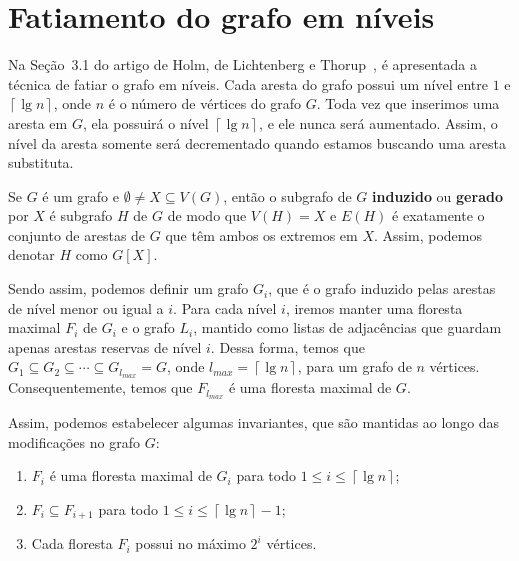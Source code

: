 \newpage

\section{Fatiamento do grafo em níveis}
\label{sec:level-slicing}

Na Seção~3.1 do artigo de Holm, de Lichtenberg e Thorup~\cite{jacob_holm}, é apresentada a técnica de fatiar o grafo em níveis. Cada aresta do grafo possui um nível entre $1$ e $\left\lceil \lg n \right\rceil$, onde $n$ é o número de vértices do grafo $G$. Toda vez que inserimos uma aresta em $G$, ela possuirá o nível $\left\lceil \lg n \right\rceil$, e ele nunca será aumentado. Assim, o nível da aresta somente será decrementado quando estamos buscando uma aresta substituta. 

Se $G$ é um grafo e $\emptyset \neq X \subseteq V(G)$, então o subgrafo de $G$ \textbf{induzido} ou \textbf{gerado} por $X$ é subgrafo $H$ de $G$ de modo que $V(H) = X$ e $E(H)$ é exatamente o conjunto de arestas de $G$ que têm ambos os extremos em $X$. Assim, podemos denotar $H$ como $G[X]$.

Sendo assim, podemos definir um grafo $G_i$, que é o grafo induzido pelas arestas de nível menor ou igual a $i$. Para cada nível $i$, iremos manter uma floresta maximal $F_i$ de $G_i$ e o grafo $L_i$, mantido como listas de adjacências que guardam apenas arestas reservas de nível $i$. Dessa forma, temos que $G_1 \subseteq G_2 \subseteq \cdots \subseteq G_{l_{max}} = G$, onde $l_{max} =  \left\lceil \lg n \right\rceil$, para um grafo de $n$ vértices. Consequentemente, temos que $F_{l_{max}}$ é uma floresta maximal de $G$. 

Assim, podemos estabelecer algumas invariantes, que são mantidas ao longo das modificações no grafo $G$:

\begin{enumerate}[label=(\Roman*)]
    \item \label{invariant1} $F_i$ é uma floresta maximal de $G_i$ para todo $1 \leq i \leq  \left\lceil \lg n \right\rceil$;
    
    \item \label{invariant2} $F_i \subseteq F_{i+1}$ para todo $1 \leq i \leq \left\lceil \lg n \right\rceil - 1$;
    
    \item \label{invariant3} Cada floresta $F_i$ possui no máximo $2^i$ vértices.
\end{enumerate}

